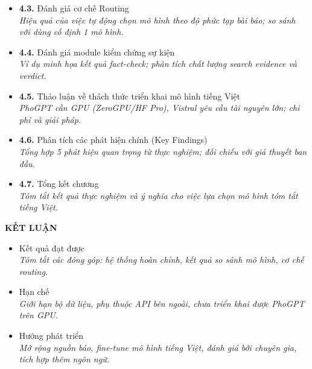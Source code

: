 \documentclass[a4paper,12pt]{article}
\begin{document}
\begin{itemize}[leftmargin=1cm, labelsep=0.3cm, itemsep=1pt, label={}]
  \item \textbf{4.3.} Đánh giá cơ chế Routing \\
  {\small\itshape Hiệu quả của việc tự động chọn mô hình theo độ phức tạp bài báo; so sánh với dùng cố định 1 mô hình.}

  \item \textbf{4.4.} Đánh giá module kiểm chứng sự kiện \\
  {\small\itshape Ví dụ minh họa kết quả fact-check; phân tích chất lượng search evidence và verdict.}

  \item \textbf{4.5.} Thảo luận về thách thức triển khai mô hình tiếng Việt \\
  {\small\itshape PhoGPT cần GPU (ZeroGPU/HF Pro), Vistral yêu cầu tài nguyên lớn; chi phí và giải pháp.}

  \item \textbf{4.6.} Phân tích các phát hiện chính (Key Findings) \\
  {\small\itshape Tổng hợp 5 phát hiện quan trọng từ thực nghiệm; đối chiếu với giả thuyết ban đầu.}

  \item \textbf{4.7.} Tổng kết chương \\
  {\small\itshape Tóm tắt kết quả thực nghiệm và ý nghĩa cho việc lựa chọn mô hình tóm tắt tiếng Việt.}
\end{itemize}

\vspace{0.5cm}

{\fontsize{13pt}{15pt}\selectfont\bfseries KẾT LUẬN}
\begin{itemize}[leftmargin=1cm, labelsep=0.3cm, itemsep=3pt, label={--}]
  \item Kết quả đạt được \\
    {\small\itshape Tóm tắt các đóng góp: hệ thống hoàn chỉnh, kết quả so sánh mô hình, cơ chế routing.}
  \item Hạn chế \\
    {\small\itshape Giới hạn bộ dữ liệu, phụ thuộc API bên ngoài, chưa triển khai được PhoGPT trên GPU.}
  \item Hướng phát triển \\
    {\small\itshape Mở rộng nguồn báo, fine-tune mô hình tiếng Việt, đánh giá bởi chuyên gia, tích hợp thêm ngôn ngữ.}
\end{itemize}

\vspace{0.5cm}
\end{document}
